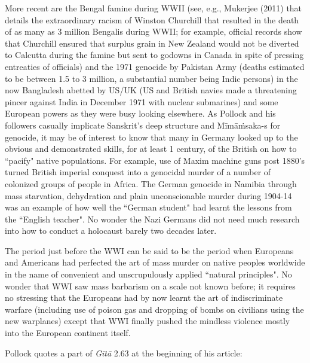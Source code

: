 More recent are the Bengal famine during WWII (see, e.g., Mukerjee (2011) that details the extraordinary racism of Winston Churchill that resulted in the death of as many as 3 million Bengalis during WWII; for example, official records show that Churchill ensured that surplus grain in New Zealand would not be diverted to Calcutta during the famine but sent to godowns in Canada in spite of pressing entreaties of officials) and the 1971 genocide by Pakistan Army (deaths estimated to be between 1.5 to 3 million, a substantial number being Indic persons) in the now Bangladesh abetted by US/UK (US and British navies made a threatening pincer against India in December 1971 with nuclear submarines) and some European powers as they were busy looking elsewhere. As Pollock and his followers casually implicate Sanskrit's deep structure and Mīmāṁsaka-s for genocide, it may be of interest to know that many in Germany looked up to the obvious and demonstrated skills, for at least 1 century, of the British on how to ``pacify" native populations. For example, use of Maxim machine guns post 1880's turned British imperial conquest into a genocidal murder of a number of colonized groups of people in Africa. The German genocide in Namibia through mass starvation, dehydration and plain unconscionable murder during 1904-14 was an example of how well the ``German student" had learnt the lessons from the ``English teacher". No wonder the Nazi Germans did not need much research into how to conduct a holocaust barely two decades later.

The period just before the WWI can be said to be the period when Europeans and Americans had perfected the art of mass murder on native peoples worldwide in the name of convenient and unscrupulously applied ``natural principles". No wonder that WWI saw mass barbarism on a scale not known before; it requires no stressing that the Europeans had by now learnt the art of indiscriminate warfare (including use of poison gas and dropping of bombs on civilians using the new warplanes) except that WWI finally pushed the mindless violence mostly into the European continent itself.

Pollock quotes a part of {\sl Gītā} 2.63 at the beginning of his article: 

